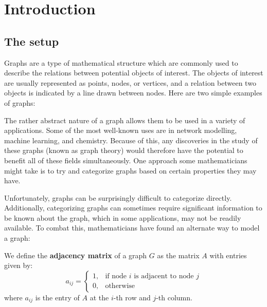 \documentclass{article}
\begin{document}
\cover
\toc
{}

\iffalse
    \cite{cat}
\fi


\section{Introduction}
\subsection{The setup}

Graphs are a type of mathematical structure which are commonly used to describe the relations between potential objects of interest.
The objects of interest are usually represented as points, nodes, or vertices, and a relation between two objects is indicated by a line drawn between nodes.
Here are two simple examples of graphs:

\begin{figure}[ht]
\centering
{}
\end{figure}

The rather abstract nature of a graph allows them to be used in a variety of applications.
Some of the most well-known uses are in network modelling, machine learning, and chemistry.
Because of this, any discoveries in the study of these graphs (known as graph theory) would therefore have the potential to benefit all of these fields simultaneously.
One approach some mathematicians might take is to try and categorize graphs based on certain properties they may have. \npgh

Unfortunately, graphs can be surprisingly difficult to categorize directly.
Additionally, categorizing graphs can sometimes require significant information to be known about the graph, which in some applications, may not be readily available.
To combat this, mathematicians have found an alternate way to model a graph:

\begin{defn}
We define the \textbf{adjacency matrix} of a graph $ G $ as the matrix $ A $ with entries given by:
\begin{equation*}
    a_{ij} = \begin{cases} 1, & \textrm{if node } i \textrm{ is adjacent to node } j \\ 0, & \textrm{otherwise} \end{cases}
\end{equation*}
where $ a_{ij} $ is the entry of $ A $ at the $ i $-th row and $ j $-th column.
\end{defn}
\end{document}
